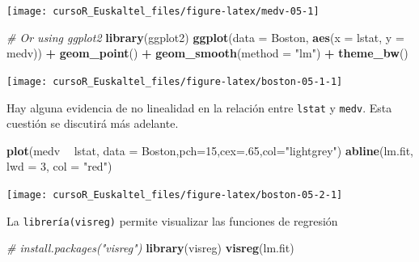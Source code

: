\documentclass[]{book}
\newenvironment{Shaded}{\begin{snugshade}}{\end{snugshade}}
\newcommand{\KeywordTok}[1]{\textcolor[rgb]{0.13,0.29,0.53}{\textbf{#1}}}
\newcommand{\DataTypeTok}[1]{\textcolor[rgb]{0.13,0.29,0.53}{#1}}
\newcommand{\DecValTok}[1]{\textcolor[rgb]{0.00,0.00,0.81}{#1}}
\newcommand{\StringTok}[1]{\textcolor[rgb]{0.31,0.60,0.02}{#1}}
\newcommand{\CommentTok}[1]{\textcolor[rgb]{0.56,0.35,0.01}{\textit{#1}}}
\newcommand{\OperatorTok}[1]{\textcolor[rgb]{0.81,0.36,0.00}{\textbf{#1}}}
\newcommand{\NormalTok}[1]{#1}
\begin{document}
\begin{center}\texttt{[image: cursoR\_Euskaltel\_files/figure-latex/medv-05-1]} \end{center}

\begin{Shaded}
\begin{Highlighting}[]
\CommentTok{# Or using ggplot2}
\KeywordTok{library}\NormalTok{(ggplot2)}
\KeywordTok{ggplot}\NormalTok{(}\DataTypeTok{data =}\NormalTok{ Boston, }\KeywordTok{aes}\NormalTok{(}\DataTypeTok{x =}\NormalTok{ lstat, }\DataTypeTok{y =}\NormalTok{ medv)) }\OperatorTok{+}
\StringTok{  }\KeywordTok{geom_point}\NormalTok{() }\OperatorTok{+}\StringTok{ }
\StringTok{  }\KeywordTok{geom_smooth}\NormalTok{(}\DataTypeTok{method =} \StringTok{"lm"}\NormalTok{) }\OperatorTok{+}\StringTok{ }
\StringTok{  }\KeywordTok{theme_bw}\NormalTok{()}
\end{Highlighting}
\end{Shaded}

\begin{center}\texttt{[image: cursoR\_Euskaltel\_files/figure-latex/boston-05-1-1]} \end{center}

Hay alguna evidencia de no linealidad en la relación entre
\texttt{lstat} y \texttt{medv}. Esta cuestión se discutirá más adelante.

\begin{Shaded}
\begin{Highlighting}[]
\KeywordTok{plot}\NormalTok{(medv }\OperatorTok{~}\StringTok{ }\NormalTok{lstat, }\DataTypeTok{data =}\NormalTok{ Boston,}\DataTypeTok{pch=}\DecValTok{15}\NormalTok{,}\DataTypeTok{cex=}\NormalTok{.}\DecValTok{65}\NormalTok{,}\DataTypeTok{col=}\StringTok{"lightgrey"}\NormalTok{)}
\KeywordTok{abline}\NormalTok{(lm.fit, }\DataTypeTok{lwd =} \DecValTok{3}\NormalTok{, }\DataTypeTok{col =} \StringTok{"red"}\NormalTok{)}
\end{Highlighting}
\end{Shaded}

\begin{center}\texttt{[image: cursoR\_Euskaltel\_files/figure-latex/boston-05-2-1]} \end{center}

La \texttt{librería(visreg)} permite visualizar las funciones de
regresión

\begin{Shaded}
\begin{Highlighting}[]
\CommentTok{# install.packages("visreg")}
\KeywordTok{library}\NormalTok{(visreg)}
\KeywordTok{visreg}\NormalTok{(lm.fit)}
\end{Highlighting}
\end{Shaded}
\end{document}
